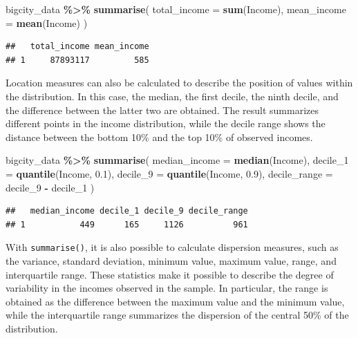 \documentclass[
  english,
  12pt,
]{book}
\newenvironment{Shaded}{\begin{snugshade}}{\end{snugshade}}
\newcommand{\AttributeTok}[1]{\textcolor[rgb]{0.13,0.29,0.53}{#1}}
\newcommand{\FloatTok}[1]{\textcolor[rgb]{0.00,0.00,0.81}{#1}}
\newcommand{\FunctionTok}[1]{\textcolor[rgb]{0.13,0.29,0.53}{\textbf{#1}}}
\newcommand{\NormalTok}[1]{#1}
\newcommand{\SpecialCharTok}[1]{\textcolor[rgb]{0.81,0.36,0.00}{\textbf{#1}}}
\begin{document}
\begin{Shaded}
\begin{Highlighting}[]
\NormalTok{bigcity\_data }\SpecialCharTok{\%\textgreater{}\%}
  \FunctionTok{summarise}\NormalTok{(}
    \AttributeTok{total\_income =} \FunctionTok{sum}\NormalTok{(Income),}
    \AttributeTok{mean\_income =} \FunctionTok{mean}\NormalTok{(Income)}
\NormalTok{  )}
\end{Highlighting}
\end{Shaded}

\begin{verbatim}
##   total_income mean_income
## 1     87893117         585
\end{verbatim}

Location measures can also be calculated to describe the position of values within the distribution. In this case, the median, the first decile, the ninth decile, and the difference between the latter two are obtained. The result summarizes different points in the income distribution, while the decile range shows the distance between the bottom 10\% and the top 10\% of observed incomes.

\begin{Shaded}
\begin{Highlighting}[]
\NormalTok{bigcity\_data }\SpecialCharTok{\%\textgreater{}\%}
  \FunctionTok{summarise}\NormalTok{(}
    \AttributeTok{median\_income =} \FunctionTok{median}\NormalTok{(Income),}
    \AttributeTok{decile\_1 =} \FunctionTok{quantile}\NormalTok{(Income, }\FloatTok{0.1}\NormalTok{),}
    \AttributeTok{decile\_9 =} \FunctionTok{quantile}\NormalTok{(Income, }\FloatTok{0.9}\NormalTok{),}
    \AttributeTok{decile\_range =}\NormalTok{ decile\_9 }\SpecialCharTok{{-}}\NormalTok{ decile\_1}
\NormalTok{  )}
\end{Highlighting}
\end{Shaded}

\begin{verbatim}
##   median_income decile_1 decile_9 decile_range
## 1           449      165     1126          961
\end{verbatim}

With \texttt{summarise()}, it is also possible to calculate dispersion measures, such as the variance, standard deviation, minimum value, maximum value, range, and interquartile range. These statistics make it possible to describe the degree of variability in the incomes observed in the sample. In particular, the range is obtained as the difference between the maximum value and the minimum value, while the interquartile range summarizes the dispersion of the central 50\% of the distribution.
\end{document}

